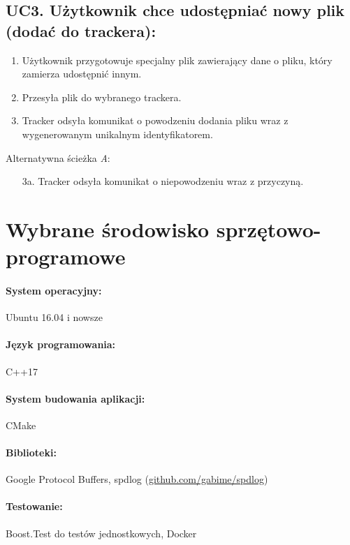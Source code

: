\documentclass[11pt]{article}
\begin{document}
\subsection{UC3. Użytkownik chce udostępniać nowy plik (dodać do trackera):}
\begin{enumerate}
	\item Użytkownik przygotowuje specjalny plik zawierający dane o pliku, który zamierza udostępnić innym.
	\item Przesyła plik do wybranego trackera.
	\item Tracker odsyła komunikat o powodzeniu dodania pliku wraz z wygenerowanym unikalnym identyfikatorem.
\end{enumerate}
Alternatywna ścieżka \textsl{A}:
\begin{itemize}
	\item [3a.] Tracker odsyła komunikat o niepowodzeniu wraz z przyczyną.
\end{itemize}
\section{Wybrane środowisko sprzętowo-programowe}
\paragraph{System operacyjny:}
Ubuntu 16.04 i nowsze
\paragraph{Język programowania:}
 C++17
\paragraph{System budowania aplikacji:}
CMake
\paragraph{Biblioteki:}
Google Protocol Buffers, spdlog (\url{github.com/gabime/spdlog})
\paragraph{Testowanie:}
Boost.Test do testów jednostkowych, Docker
\end{document}
